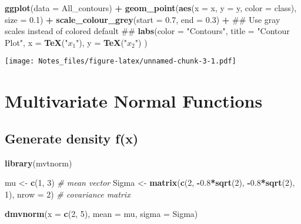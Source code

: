 \documentclass[]{book}
\newenvironment{Shaded}{\begin{snugshade}}{\end{snugshade}}
\newcommand{\KeywordTok}[1]{\textcolor[rgb]{0.13,0.29,0.53}{\textbf{#1}}}
\newcommand{\DataTypeTok}[1]{\textcolor[rgb]{0.13,0.29,0.53}{#1}}
\newcommand{\DecValTok}[1]{\textcolor[rgb]{0.00,0.00,0.81}{#1}}
\newcommand{\FloatTok}[1]{\textcolor[rgb]{0.00,0.00,0.81}{#1}}
\newcommand{\StringTok}[1]{\textcolor[rgb]{0.31,0.60,0.02}{#1}}
\newcommand{\CommentTok}[1]{\textcolor[rgb]{0.56,0.35,0.01}{\textit{#1}}}
\newcommand{\OperatorTok}[1]{\textcolor[rgb]{0.81,0.36,0.00}{\textbf{#1}}}
\newcommand{\NormalTok}[1]{#1}
\theoremstyle{definition}
\theoremstyle{definition}
\theoremstyle{definition}
\theoremstyle{remark}
\begin{document}
\begin{Shaded}
\begin{Highlighting}[]
\KeywordTok{ggplot}\NormalTok{(}\DataTypeTok{data =}\NormalTok{ All_contours) }\OperatorTok{+}
\StringTok{    }\KeywordTok{geom_point}\NormalTok{(}\KeywordTok{aes}\NormalTok{(}\DataTypeTok{x =}\NormalTok{ x, }\DataTypeTok{y =}\NormalTok{ y, }\DataTypeTok{color =}\NormalTok{ class),}
               \DataTypeTok{size =} \FloatTok{0.1}\NormalTok{) }\OperatorTok{+}
\StringTok{    }\KeywordTok{scale_colour_grey}\NormalTok{(}\DataTypeTok{start =} \FloatTok{0.7}\NormalTok{, }\DataTypeTok{end =} \FloatTok{0.3}\NormalTok{) }\OperatorTok{+}
\StringTok{        }\NormalTok{## Use gray scales instead of colored default ##}
\StringTok{    }\KeywordTok{labs}\NormalTok{(}\DataTypeTok{color =} \StringTok{"Contours"}\NormalTok{, }
         \DataTypeTok{title =} \StringTok{"Contour Plot"}\NormalTok{,}
         \DataTypeTok{x =} \KeywordTok{TeX}\NormalTok{(}\StringTok{"$x_1$"}\NormalTok{), }\DataTypeTok{y =} \KeywordTok{TeX}\NormalTok{(}\StringTok{"$x_2$"}\NormalTok{)}
\NormalTok{    )}
\end{Highlighting}
\end{Shaded}

\texttt{[image: Notes\_files/figure-latex/unnamed-chunk-3-1.pdf]}

\section{Multivariate Normal
Functions}\label{multivariate-normal-functions}

\subsection{Generate density f(x)}\label{generate-density-fx}

\begin{Shaded}
\begin{Highlighting}[]
\KeywordTok{library}\NormalTok{(mvtnorm)}

\NormalTok{mu <-}\StringTok{ }\KeywordTok{c}\NormalTok{(}\DecValTok{1}\NormalTok{, }\DecValTok{3}\NormalTok{) }\CommentTok{# mean vector}
\NormalTok{Sigma <-}\StringTok{ }\KeywordTok{matrix}\NormalTok{(}\KeywordTok{c}\NormalTok{(}\DecValTok{2}\NormalTok{, }\OperatorTok{-}\FloatTok{0.8}\OperatorTok{*}\KeywordTok{sqrt}\NormalTok{(}\DecValTok{2}\NormalTok{), }\OperatorTok{-}\FloatTok{0.8}\OperatorTok{*}\KeywordTok{sqrt}\NormalTok{(}\DecValTok{2}\NormalTok{), }\DecValTok{1}\NormalTok{),}
                \DataTypeTok{nrow =} \DecValTok{2}\NormalTok{) }\CommentTok{# covariance matrix}

\KeywordTok{dmvnorm}\NormalTok{(}\DataTypeTok{x =} \KeywordTok{c}\NormalTok{(}\DecValTok{2}\NormalTok{, }\DecValTok{5}\NormalTok{), }\DataTypeTok{mean =}\NormalTok{ mu, }\DataTypeTok{sigma =}\NormalTok{ Sigma)}
\end{Highlighting}
\end{Shaded}
\end{document}
